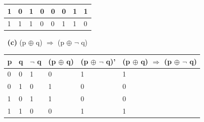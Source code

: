 \documentclass[a4 paper]{article}
\numberwithin{equation}{section}
\newcommand{\subproblem}[1]{~\newline\textbf{(#1)}}
\newcommand{\0}{\mathbf{0}}
\begin{document}
\begin{table}[h!]
\begin{tabular}{|l|l|l|l|l|l|l|l|}
1                                & 0                               & 1                               & 0                                & 0                                & 0                                     & 1                                         & 1                                    \\ \hline
1                                & 1                               & 1                               & 0                                & 0                                & 1                                     & 1                                         & 0                                    \\ \hline
\end{tabular}
\end{table}


\subproblem{c} (p $\oplus$ q) $\Rightarrow$ (p $\oplus$ $\neg$ q)
\begin{table}[h!]
\begin{tabular}{|l|l|l|l|l|l|}
\hline
\multicolumn{1}{|c|}{\textbf{p}} & \multicolumn{1}{c|}{\textbf{q}} & \multicolumn{1}{c|}{\textbf{$\neg$ q}} & \multicolumn{1}{c|}{\textbf{(p $\oplus$ q)}} & \multicolumn{1}{c|}{\textbf{(p $\oplus$ $\neg$ q)'}} & \multicolumn{1}{c|}{\textbf{(p $\oplus$ q) $\Rightarrow$ (p $\oplus$ $\neg$ q)}} \\ \hline
0                                & 0                               & 1                                & 0                                  & 1                                   & 1                                    \\ \hline
0                                & 1                               & 0                                & 1                                  & 0                                   & 0                                    \\ \hline
1                                & 0                               & 1                                & 1                                  & 0                                   & 0                                    \\ \hline
1                                & 1                               & 0                                & 0                                  & 1                                   & 1                                    \\ \hline
\end{tabular}
\end{table}

\newpage
\end{document}
